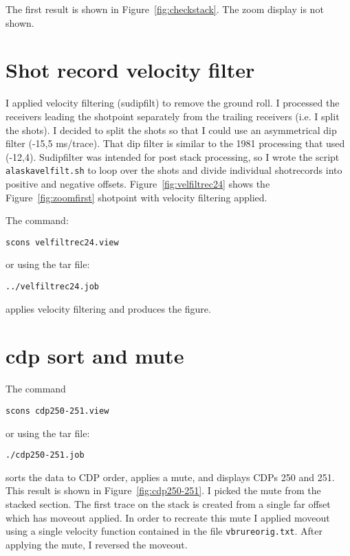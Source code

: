 The first result is shown in Figure~\ref{fig:checkstack}.  The zoom display
is not shown.


\section{Shot record velocity filter}
I applied velocity filtering (sudipfilt) to remove the ground roll.  I
processed the receivers leading the shotpoint separately from the
trailing receivers (i.e. I split the shots).  I decided to split the
shots so that I could use an asymmetrical dip filter (-15,5 ms/trace).
That dip filter is similar to the 1981 processing that used
(-12,4). Sudipfilter was intended for post stack processing, so I
wrote the script \texttt{alaskavelfilt.sh} to loop over the shots and
divide individual shotrecords into positive and negative offsets.
Figure~\ref{fig:velfiltrec24} shows the Figure~\ref{fig:zoomfirst} 
shotpoint with velocity filtering applied.

The command:
\begin{verbatim}
scons velfiltrec24.view 
\end{verbatim}
or using the tar file:
\begin{verbatim}
../velfiltrec24.job 
\end{verbatim}
applies velocity filtering and produces the figure.


\section{cdp sort and mute}

The command
\begin{verbatim}
scons cdp250-251.view 
\end{verbatim}
or using the tar file:
\begin{verbatim}
./cdp250-251.job
\end{verbatim}
sorts the data to CDP order, applies a mute, and displays CDPs 250 and 
251.  This result is shown in Figure~\ref{fig:cdp250-251}.  I picked 
the mute from the stacked section.  The first trace on the stack is 
created from a single far offset which has moveout applied.  
In order to recreate this mute I applied moveout using a single velocity 
function contained in the file \texttt{vbrureorig.txt}. After applying the 
mute, I reversed the moveout.

